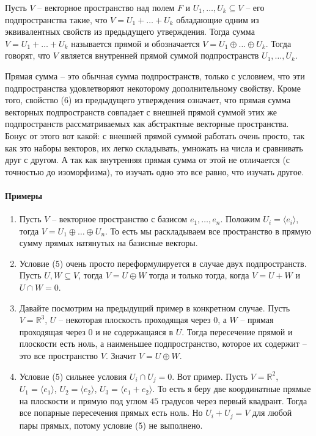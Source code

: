 \begin{definition}
Пусть $V$ -- векторное пространство над полем $F$ и $U_1,\ldots,U_k \subseteq V$ -- его подпространства такие, что $V = U_1+\ldots + U_k$ обладающие одним из эквивалентных свойств из предыдущего утверждения. Тогда сумма $V = U_1+\ldots + U_k$  называется прямой и обозначается $V = U_1\oplus\ldots\oplus U_k$. Тогда говорят, что $V$ является внутренней прямой суммой подпространств $U_1,\ldots,U_k$.
\end{definition}

Прямая сумма -- это обычная сумма подпространств, только с условием, что эти подпространства удовлетворяют некоторому дополнительному свойству. Кроме того, свойство (6) из предыдущего утверждения означает, что прямая сумма векторных подпространств совпадает с внешней прямой суммой этих же подпространств рассматриваемых как абстрактные векторные пространства. Бонус от этого вот какой: с внешней прямой суммой работать очень просто, так как это наборы векторов, их легко складывать, умножать на числа и сравнивать друг с другом. А так как внутренняя прямая сумма от этой не отличается (с точностью до изоморфизма), то изучать одно это все равно, что изучать другое.


\paragraph{Примеры}

\begin{enumerate}
\item Пусть $V$ -- векторное пространство с базисом $e_1,\ldots,e_n$. Положим $U_i = \langle e_i \rangle$, тогда $V = U_1 \oplus \ldots \oplus U_n$. То есть мы раскладываем все пространство в прямую сумму прямых натянутых на базисные векторы.

\item Условие (5) очень просто переформулируется в случае двух подпространств. Пусть $U, W\subseteq V$, тогда $V = U \oplus W$ тогда и только тогда, когда $V = U + W$ и $U \cap W = 0$.

\item Давайте посмотрим на предыдущий пример в конкретном случае. Пусть $V=\mathbb R^3$, $U$ -- некоторая плоскость проходящая через $0$, а $W$ -- прямая проходящая через $0$ и не содержащаяся в $U$. Тогда пересечение прямой и плоскости есть ноль, а наименьшее подпространство, которое их содержит -- это все пространство $V$. Значит $V = U \oplus W$.

\item Условие (5) сильнее условия $U_i \cap U_j = 0$. Вот пример. Пусть $V = \mathbb R^2$, $U_1 = \langle e_1\rangle$, $U_2 = \langle e_2\rangle$, $U_3 = \langle e_1 + e_2\rangle$. То есть я беру две координатные прямые на плоскости и прямую под углом $45$ градусов через первый квадрант. Тогда все попарные пересечения прямых есть ноль. Но $U_i + U_j = V$ для любой пары прямых, потому условие (5) не выполнено.
\end{enumerate}

